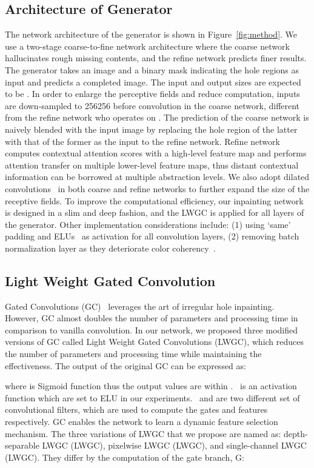 \documentclass[oribibl]{llncs}  \usepackage[width=122mm,left=12mm,paperwidth=146mm,height=193mm,top=12mm,paperheight=217mm]{geometry}
\begin{document}
\subsection{Architecture of Generator}
\label{sect:network}
The network architecture of the generator is shown in Figure~\ref{fig:method}. We use a two-stage coarse-to-fine network architecture where the coarse network hallucinates rough missing contents, and the refine network predicts finer results. The generator takes an image and a binary mask indicating the hole regions as input and predicts a completed image. The input and output sizes are expected to be . In order to enlarge the perceptive fields and reduce computation, inputs are down-sampled to 256256 before convolution in the coarse network, different from the refine network who operates on . The prediction of the coarse network is naively blended with the input image by replacing the hole region of the latter with that of the former as the input to the refine network. Refine network computes contextual attention scores with a high-level feature map and performs attention transfer on multiple lower-level feature maps, thus distant contextual information can be borrowed at multiple abstraction levels. We also adopt dilated convolutions~\cite{iizuka2017globally} in both coarse and refine networks to further expand the size of the receptive fields. To improve the computational efficiency, our inpainting network is designed in a slim and deep fashion, and the LWGC is applied for all layers of the generator. Other implementation considerations include: (1) using `same' padding and ELUs~\cite{clevert2015fast} as activation for all convolution layers, (2) removing batch normalization layer as they deteriorate color coherency~\cite{iizuka2017globally}. 

\subsection{Light Weight Gated Convolution} 
Gated Convolutions (GC)~\cite{yu2018free} leverages the art of irregular hole inpainting. However, GC almost doubles the number of parameters and processing time in comparison to vanilla convolution. In our network, we proposed three modified versions of GC called Light Weight Gated Convolutions (LWGC), which reduces the number of parameters and processing time while maintaining the effectiveness. The output of the original GC can be expressed as:



\noindent where  is Sigmoid function thus the output values are within .~ is an activation function which are set to ELU in our experiments.~ and  are two different set of convolutional filters, which are used to compute the gates and features respectively. GC enables the network to learn a dynamic feature selection mechanism. The three variations of LWGC that we propose are named as: depth-separable LWGC (LWGC), pixelwise LWGC (LWGC), and single-channel LWGC (LWGC). They differ by the computation of the gate branch, G:
\end{document}
